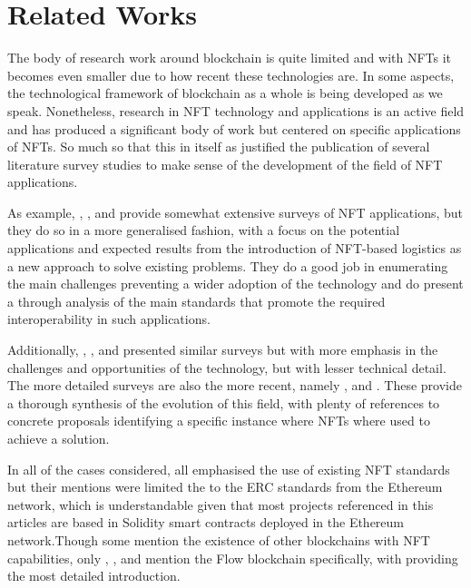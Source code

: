 \documentclass[../main.tex]{subfiles}
\begin{document}
\section{Related Works}
\label{sec:related_works}
The body of research work around blockchain is quite limited and with NFTs it becomes even smaller due to how recent these technologies are. In some aspects, the technological framework of blockchain as a whole is being developed as we speak. Nonetheless, research in NFT technology and applications is an active field and has produced a significant body of work but centered on specific applications of NFTs. So much so that this in itself as justified the publication of several literature survey studies to make sense of the development of the field of NFT applications.
\par
As example, \cite{Far2022}, \cite{Wajiha2022}, and \cite{Hammi2023} provide somewhat extensive surveys of NFT applications, but they do so in a more generalised fashion, with a focus on the potential applications and expected results from the introduction of NFT-based logistics as a new approach to solve existing problems. They do a good job in enumerating the main challenges preventing a wider adoption of the technology and do present a through analysis of the main standards that promote the required interoperability in such applications.
\par
Additionally, \cite{Wang2021}, \cite{Bao2022}, and \cite{Ali2023} presented similar surveys but with more emphasis in the challenges and opportunities of the technology, but with lesser technical detail. The more detailed surveys are also the more recent, namely \cite{Razi2024}, and \cite{Guidi2023}. These provide a thorough synthesis of the evolution of this field, with plenty of references to concrete proposals identifying a specific instance where NFTs where used to achieve a solution.
\par
In all of the cases considered, all emphasised the use of existing NFT standards but their mentions were limited the to the ERC standards from the Ethereum network, which is understandable given that most projects referenced in this articles are based in Solidity smart contracts deployed in the Ethereum network.Though some mention the existence of other blockchains with NFT capabilities, only \cite{Wang2021}, \cite{Razi2024}, and \cite{Guidi2023} mention the Flow blockchain specifically, with \cite{Guidi2023} providing the most detailed introduction.
\end{document}
